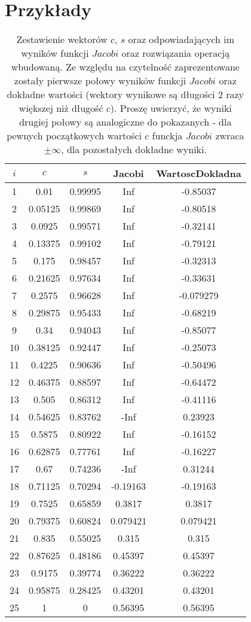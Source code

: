 \documentclass{article}
\begin{document}
	\section{Przykłady}
	
	\begin{table}[h]
		\centering
		\begin{tabular}{|c|c|c|c|c|}
			\hline
			$i$ & $c$ & $s$ & Jacobi & WartoscDokladna \\
			\hline
			1 & 0.01 & 0.99995 & Inf & -0.85037 \\
			2 & 0.05125 & 0.99869 & Inf & -0.80518 \\
			3 & 0.0925 & 0.99571 & Inf & -0.32141 \\
			4 & 0.13375 & 0.99102 & Inf & -0.79121 \\
			5 & 0.175 & 0.98457 & Inf & -0.32313 \\
			6 & 0.21625 & 0.97634 & Inf & -0.33631 \\
			7 & 0.2575 & 0.96628 & Inf & -0.079279 \\
			8 & 0.29875 & 0.95433 & Inf & -0.68219 \\
			9 & 0.34 & 0.94043 & Inf & -0.85077 \\
			10 & 0.38125 & 0.92447 & Inf & -0.25073 \\
			11 & 0.4225 & 0.90636 & Inf & -0.50496 \\
			12 & 0.46375 & 0.88597 & Inf & -0.64472 \\
			13 & 0.505 & 0.86312 & Inf & -0.41116 \\
			14 & 0.54625 & 0.83762 & -Inf & 0.23923 \\
			15 & 0.5875 & 0.80922 & Inf & -0.16152 \\
			16 & 0.62875 & 0.77761 & Inf & -0.16227 \\
			17 & 0.67 & 0.74236 & -Inf & 0.31244 \\
			18 & 0.71125 & 0.70294 & -0.19163 & -0.19163 \\
			19 & 0.7525 & 0.65859 & 0.3817 & 0.3817 \\
			20 & 0.79375 & 0.60824 & 0.079421 & 0.079421 \\
			21 & 0.835 & 0.55025 & 0.315 & 0.315 \\
			22 & 0.87625 & 0.48186 & 0.45397 & 0.45397 \\
			23 & 0.9175 & 0.39774 & 0.36222 & 0.36222 \\
			24 & 0.95875 & 0.28425 & 0.43201 & 0.43201 \\
			25 & 1 & 0 & 0.56395 & 0.56395 \\
			\hline
		\end{tabular}
		\caption{Zestawienie wektorów $c$, $s$ oraz odpowiadających im wyników funkcji $Jacobi$ oraz rozwiązania operacją wbudowaną. Ze względu na czytelność zaprezentowane zostały pierwsze połowy wyników funkcji $Jacobi$ oraz dokładne wartości (wektory wynikowe są długości 2 razy większej niż długość $c$). Proszę uwierzyć, że wyniki drugiej połowy są analogiczne do pokazanych - dla pewnych początkowych wartości $c$ funckja $Jacobi$ zwraca $\pm \infty$, dla pozostałych dokładne wyniki.}
	\end{table}
\end{document}
